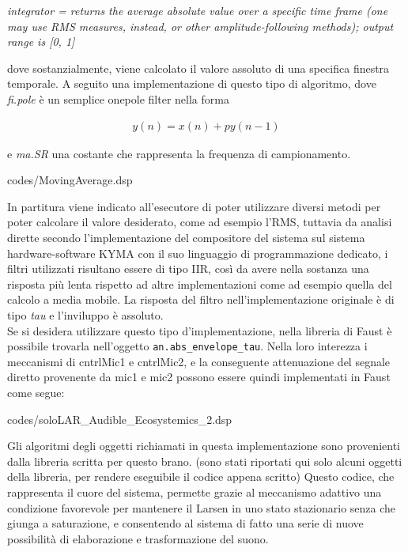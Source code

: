 \begin{center}
    \vspace{0.5cm}
    \textit{integrator = returns the average absolute value over a specific 
    time frame (one may use RMS measures, instead, or other amplitude-following methods); 
    output range is [0, 1]}
    \vspace{0.5cm}
\end{center}

dove sostanzialmente, viene calcolato il valore assoluto di una specifica finestra temporale. 
A seguito una implementazione di questo tipo di algoritmo, dove \textit{fi.pole} è 
un semplice onepole filter nella forma

\begin{align*} 
    y(n) = x(n) + py(n-1)
\end{align*}

e \textit{ma.SR} una costante che rappresenta la frequenza di campionamento.

\vspace{0.5cm} 

{codes/MovingAverage.dsp}

In partitura viene indicato all'esecutore di poter utilizzare diversi metodi 
per poter calcolare il valore desiderato, come ad esempio l'RMS, 
tuttavia da analisi dirette secondo l'implementazione del compositore del sistema sul 
sistema hardware-software KYMA con il suo linguaggio di programmazione dedicato, 
i filtri utilizzati risultano essere di tipo IIR,
così da avere nella sostanza una risposta più lenta rispetto ad altre implementazioni come ad esempio 
quella del calcolo a media mobile.  
La risposta del filtro nell'implementazione originale è di tipo \textit{tau} 
e l'inviluppo è assoluto. \\
Se si desidera utilizzare questo tipo d'implementazione, nella libreria di Faust 
è possibile trovarla nell'oggetto \verb|an.abs_envelope_tau|.
Nella loro interezza i meccanismi di cntrlMic1 e cntrlMic2, e la conseguente
attenuazione del segnale diretto provenente da mic1 e mic2 
possono essere quindi implementati in Faust come segue:

\vspace{0.5cm} 

{codes/soloLAR_Audible_Ecosystemics_2.dsp}

Gli algoritmi degli oggetti richiamati in questa implementazione sono 
provenienti dalla libreria scritta per questo brano.
(sono stati riportati qui solo alcuni oggetti della libreria, per rendere eseguibile
il codice appena scritto)
Questo codice, che rappresenta il cuore del sistema,
permette grazie al meccanismo adattivo una condizione favorevole
per mantenere il Larsen in uno stato stazionario senza che giunga a 
saturazione, e consentendo al sistema
di fatto una serie di nuove possibilità di elaborazione e trasformazione del suono.

